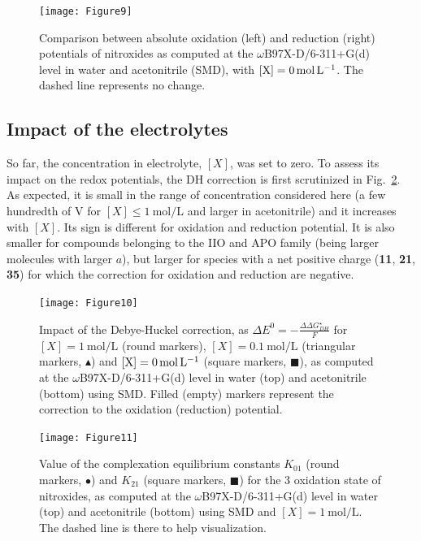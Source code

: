 \documentclass[review]{elsarticle}
\begin{document}
\begin{figure}[!h]
	\centering
	\texttt{[image: Figure9]}
	\caption{Comparison between absolute oxidation (left) and reduction (right) potentials of nitroxides as computed at the $\omega$B97X-D/6-311+G(d) level in water and acetonitrile (SMD), with $[\ce{X}]=\SI{0}{\mole\per\liter}$. The dashed line represents no change. }
	\label{fig:watvsac}
\end{figure}

\subsection{Impact of the electrolytes}

So far, the concentration in electrolyte, $[X]$, was set to zero. To assess its impact on the redox potentials, the DH correction is first scrutinized in Fig.~\ref{fig:DH}. As expected, it is small in the range of concentration considered here (a few hundredth of \si{\volt} for $[X] \leq \SI{1}{\mole\per\liter}$ and larger in acetonitrile) and it increases with $[X]$. Its sign is different for oxidation and reduction potential. It is also smaller for compounds belonging to the IIO and APO family (being larger molecules with larger $a$), but larger for species with a net positive charge (\textbf{11}, \textbf{21}, \textbf{35}) for which the correction for oxidation and reduction are negative. 


\begin{figure}[!h]
	\centering
	\texttt{[image: Figure10]}
	\caption{Impact of the Debye-Huckel correction, as $\Delta E^0 = -\frac{\Delta \Delta G_{DH}^\star}{F}$ for $[X]=\SI{1}{\mole\per\liter}$ (round markers), $[X]=\SI{0.1}{\mole\per\liter}$ (triangular markers, $\blacktriangle$)  and $[\ce{X}]=\SI{0}{\mole\per\liter}$ (square markers, $\blacksquare$), as computed at the $\omega$B97X-D/6-311+G(d) level in water (top) and acetonitrile (bottom) using SMD. Filled (empty) markers represent the correction to the oxidation (reduction) potential. }
	\label{fig:DH}
\end{figure}


\begin{figure}[!h]
\centering
\texttt{[image: Figure11]}
\caption{Value of the complexation equilibrium constants $K_{01}$ (round markers, $\bullet$) and $K_{21}$ (square markers, $\blacksquare$) for the 3 oxidation state of nitroxides, as computed at the $\omega$B97X-D/6-311+G(d) level in water (top) and acetonitrile (bottom) using SMD and $[X]=\SI{1}{\mole\per\liter}$.  The dashed line is there to help visualization. }
\label{fig:Kx1}
\end{figure}
\end{document}
